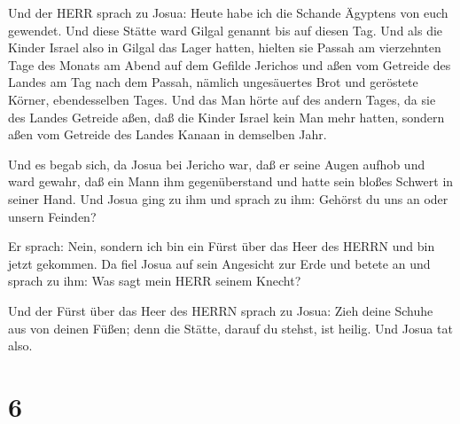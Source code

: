  Und der HERR sprach zu Josua: Heute habe ich die Schande
Ägyptens von euch gewendet. Und diese Stätte ward Gilgal genannt bis auf
diesen Tag.  Und als die Kinder Israel also in Gilgal das
Lager hatten, hielten sie Passah am vierzehnten Tage des Monats am Abend
auf dem Gefilde Jerichos  und aßen vom Getreide des Landes
am Tag nach dem Passah, nämlich ungesäuertes Brot und geröstete Körner,
ebendesselben Tages.  Und das Man hörte auf des andern
Tages, da sie des Landes Getreide aßen, daß die Kinder Israel kein Man
mehr hatten, sondern aßen vom Getreide des Landes Kanaan in demselben
Jahr.

 Und es begab sich, da Josua bei Jericho war, daß er seine
Augen aufhob und ward gewahr, daß ein Mann ihm gegenüberstand und hatte
sein bloßes Schwert in seiner Hand. Und Josua ging zu ihm und sprach zu
ihm: Gehörst du uns an oder unsern Feinden?

 Er sprach: Nein, sondern ich bin ein Fürst über das Heer
des HERRN und bin jetzt gekommen. Da fiel Josua auf sein Angesicht zur
Erde und betete an und sprach zu ihm: Was sagt mein HERR seinem Knecht?

 Und der Fürst über das Heer des HERRN sprach zu Josua:
Zieh deine Schuhe aus von deinen Füßen; denn die Stätte, darauf du
stehst, ist heilig. Und Josua tat also.

\hypertarget{section-5}{%
\section{6}\label{section-5}}

